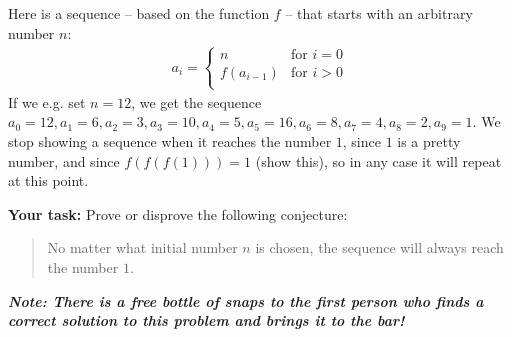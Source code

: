 Here is a sequence -- based on the function $f$ -- that starts with an arbitrary
number $n$:
\begin{align*}
a_i = \begin{cases}
n &\text{for }i = 0\\
f(a_{i - 1}) &\text{for }i > 0\\
\end{cases}
\end{align*}
If we e.g. set $n = 12$, we get the sequence
$a_0 = 12, a_1 = 6, a_2 = 3, a_3 = 10, a_4 = 5, a_5 = 16, a_6 = 8, a_7 = 4, a_8
= 2, a_9 = 1$.  We stop showing a sequence when it reaches the number $1$, since
$1$ is a pretty number, and since $f(f(f(1))) = 1$ (show this), so in any case
it will repeat at this point.

\textbf{Your task:} Prove or disprove the following conjecture:
\begin{quote}
No matter what initial number $n$ is chosen, the sequence will always reach the
number $1$.
\end{quote}

\textbf{\emph{Note: There is a free bottle of snaps to the first person who
finds a correct solution to this problem and brings it to the bar!}}
